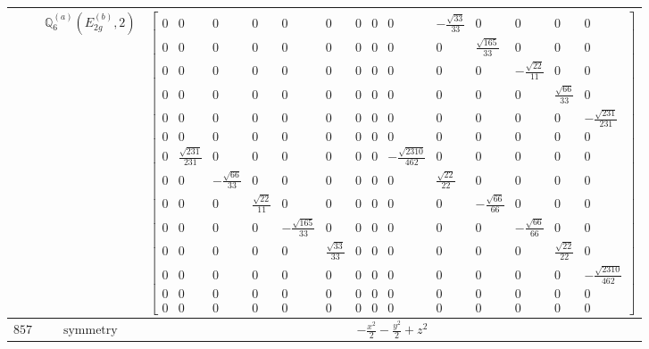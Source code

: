 \documentclass[fleqn,8pt,landscape]{jsarticle}
\begin{document}
\begin{longtable}{ccc}
$  $ & $ \mathbb{Q}_{6}^{(a)}(E_{2g}^{(b)},2) $ & $ \begin{bmatrix} 0 & 0 & 0 & 0 & 0 & 0 & 0 & 0 & 0 & - \frac{\sqrt{33}}{33} & 0 & 0 & 0 & 0 \\ 0 & 0 & 0 & 0 & 0 & 0 & 0 & 0 & 0 & 0 & \frac{\sqrt{165}}{33} & 0 & 0 & 0 \\ 0 & 0 & 0 & 0 & 0 & 0 & 0 & 0 & 0 & 0 & 0 & - \frac{\sqrt{22}}{11} & 0 & 0 \\ 0 & 0 & 0 & 0 & 0 & 0 & 0 & 0 & 0 & 0 & 0 & 0 & \frac{\sqrt{66}}{33} & 0 \\ 0 & 0 & 0 & 0 & 0 & 0 & 0 & 0 & 0 & 0 & 0 & 0 & 0 & - \frac{\sqrt{231}}{231} \\ 0 & 0 & 0 & 0 & 0 & 0 & 0 & 0 & 0 & 0 & 0 & 0 & 0 & 0 \\ 0 & \frac{\sqrt{231}}{231} & 0 & 0 & 0 & 0 & 0 & 0 & - \frac{\sqrt{2310}}{462} & 0 & 0 & 0 & 0 & 0 \\ 0 & 0 & - \frac{\sqrt{66}}{33} & 0 & 0 & 0 & 0 & 0 & 0 & \frac{\sqrt{22}}{22} & 0 & 0 & 0 & 0 \\ 0 & 0 & 0 & \frac{\sqrt{22}}{11} & 0 & 0 & 0 & 0 & 0 & 0 & - \frac{\sqrt{66}}{66} & 0 & 0 & 0 \\ 0 & 0 & 0 & 0 & - \frac{\sqrt{165}}{33} & 0 & 0 & 0 & 0 & 0 & 0 & - \frac{\sqrt{66}}{66} & 0 & 0 \\ 0 & 0 & 0 & 0 & 0 & \frac{\sqrt{33}}{33} & 0 & 0 & 0 & 0 & 0 & 0 & \frac{\sqrt{22}}{22} & 0 \\ 0 & 0 & 0 & 0 & 0 & 0 & 0 & 0 & 0 & 0 & 0 & 0 & 0 & - \frac{\sqrt{2310}}{462} \\ 0 & 0 & 0 & 0 & 0 & 0 & 0 & 0 & 0 & 0 & 0 & 0 & 0 & 0 \\ 0 & 0 & 0 & 0 & 0 & 0 & 0 & 0 & 0 & 0 & 0 & 0 & 0 & 0 \end{bmatrix} $ \\ \hline
$ 857 $ & $ \text{symmetry} $ & $ - \frac{x^{2}}{2} - \frac{y^{2}}{2} + z^{2} $ \\

\end{longtable}
\end{document}
